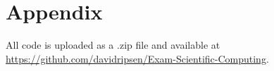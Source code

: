 \section{Appendix}
All code is uploaded as a .zip file and available at \url{https://github.com/davidripsen/Exam-Scientific-Computing}.